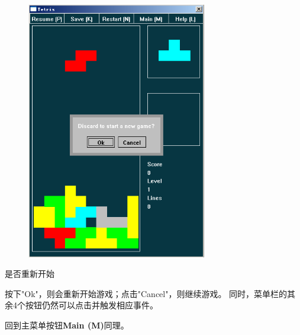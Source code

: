 \documentclass{style/ucasproposal}
\begin{document}
\begin{center}
\begin{figure}[H]
\center
    \includegraphics[width=0.7\textwidth]{./img/manual/6-restart.png}
\end{figure}
是否重新开始
\end{center}

按下"Ok"，则会重新开始游戏；点击"Cancel"，则继续游戏。
同时，菜单栏的其余4个按钮仍然可以点击并触发相应事件。

回到主菜单按钮\textbf{Main (M)}同理。

\end{document}
